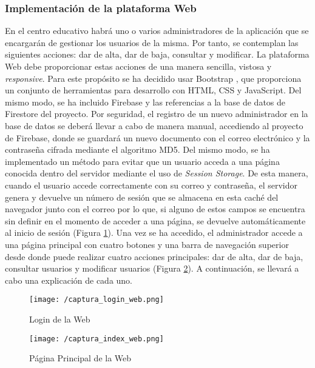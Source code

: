 \subsubsection{Implementación de la plataforma Web}
En el centro educativo habrá uno o varios administradores de la aplicación que se encargarán de gestionar los usuarios de la misma. Por tanto, se contemplan las siguientes acciones: dar de alta, dar de baja, consultar y modificar. La plataforma Web debe proporcionar estas acciones de una manera sencilla, vistosa y \textit{responsive}. Para este propósito se ha decidido usar Bootstrap \cite{Bootstrap}, que proporciona un conjunto de herramientas para desarrollo con HTML, CSS y JavaScript. Del mismo modo, se ha incluido Firebase y las referencias a la base de datos de Firestore del proyecto. Por seguridad, el registro de un nuevo administrador en la base de datos se deberá llevar a cabo de manera manual, accediendo al proyecto de Firebase, donde se guardará un nuevo documento con el correo electrónico y la contraseña cifrada mediante el algoritmo MD5. Del mismo modo, se ha implementado un método para evitar que un usuario acceda a una página conocida dentro del servidor mediante el uso de \textit{Session Storage}. De esta manera, cuando el usuario accede correctamente con su correo y contraseña, el servidor genera y devuelve un número de sesión que se almacena en esta caché del navegador junto con el correo por lo que, si alguno de estos campos se encuentra sin definir en el momento de acceder a una página, se devuelve automáticamente al inicio de sesión (Figura \ref{fig:login_web}). Una vez se ha accedido, el administrador accede a una página principal con cuatro botones y una barra de navegación superior desde donde puede realizar cuatro acciones principales: dar de alta, dar de baja, consultar usuarios y modificar usuarios (Figura \ref{fig:index_web}). A continuación, se llevará a cabo una explicación de cada uno.

\begin{figure}[!h]
	\begin{center}
		\texttt{[image: /captura\_login\_web.png]}
		\caption{Login de la Web}
		\label{fig:login_web}
	\end{center}
\end{figure}

\begin{figure}[!h]
	\begin{center}
		\texttt{[image: /captura\_index\_web.png]}
		\caption{Página Principal de la Web}
		\label{fig:index_web}
	\end{center}
\end{figure}

